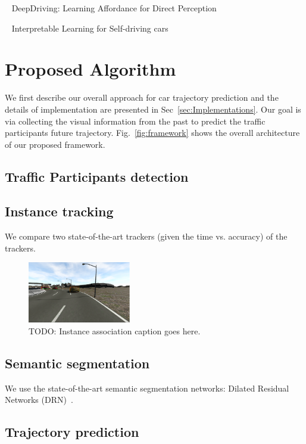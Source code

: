 \documentclass[10pt,twocolumn,letterpaper]{article}
\begin{document}
~\cite{chen2015deepdriving} DeepDriving: Learning Affordance for Direct Perception

~\cite{kim2017interpretable} Interpretable Learning for Self-driving cars



\section{Proposed Algorithm}

We first describe our overall approach for car trajectory prediction and the details of implementation are presented in Sec~\ref{sec:Implementations}.
Our goal is via collecting the visual information from the past to predict the traffic participants future trajectory. Fig.~\ref{fig:framework} shows the overall architecture of our proposed framework.

\subsection{Traffic Participants detection}


\subsection{Instance tracking}

We compare two state-of-the-art trackers (given the time vs. accuracy) of the trackers.
\begin{figure}[t]
        \centering
        \includegraphics[width=0.4\textwidth]{figures/double_detection.png}
        \caption{ {\small TODO: Instance association caption goes here.}}
        \label{fig:Instance_associationn}
\end{figure}

\subsection{Semantic segmentation}
We use the state-of-the-art semantic segmentation networks: Dilated Residual Networks (DRN)~\cite{yu2017dilated}.

\subsection{Trajectory prediction}
\end{document}
